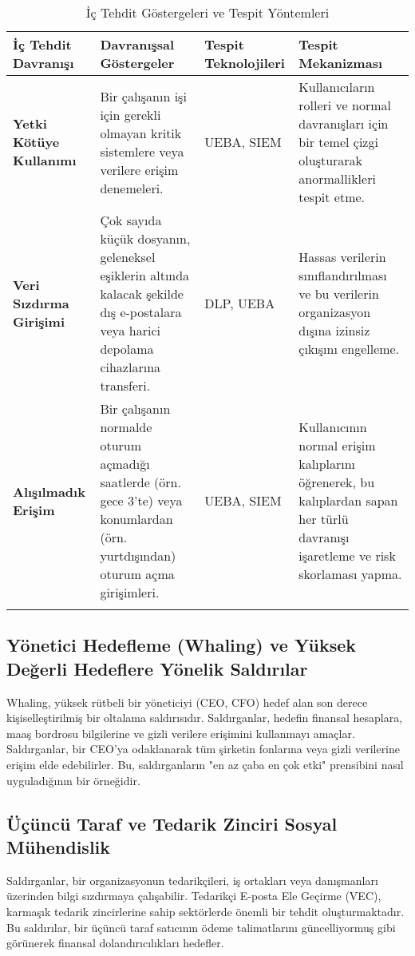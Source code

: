 \begin{longtable}{|p{4cm}|p{4cm}|p{4cm}|p{4cm}|}
    \hline
    \textbf{İç Tehdit Davranışı} & \textbf{Davranışsal Göstergeler} & \textbf{Tespit Teknolojileri} & \textbf{Tespit Mekanizması} \\
    \hline
    \endhead
    \textbf{Yetki Kötüye Kullanımı} & Bir çalışanın işi için gerekli olmayan kritik sistemlere veya verilere erişim denemeleri. & UEBA, SIEM & Kullanıcıların rolleri ve normal davranışları için bir temel çizgi oluşturarak anormallikleri tespit etme. \\
    \hline
    \textbf{Veri Sızdırma Girişimi} & Çok sayıda küçük dosyanın, geleneksel eşiklerin altında kalacak şekilde dış e-postalara veya harici depolama cihazlarına transferi. & DLP, UEBA & Hassas verilerin sınıflandırılması ve bu verilerin organizasyon dışına izinsiz çıkışını engelleme. \\
    \hline
    \textbf{Alışılmadık Erişim} & Bir çalışanın normalde oturum açmadığı saatlerde (örn. gece 3'te) veya konumlardan (örn. yurtdışından) oturum açma girişimleri. & UEBA, SIEM & Kullanıcının normal erişim kalıplarını öğrenerek, bu kalıplardan sapan her türlü davranışı işaretleme ve risk skorlaması yapma. \\
    \hline
\caption{İç Tehdit Göstergeleri ve Tespit Yöntemleri}
\end{longtable}

\subsection{Yönetici Hedefleme (Whaling) ve Yüksek Değerli Hedeflere Yönelik Saldırılar}

Whaling, yüksek rütbeli bir yöneticiyi (CEO, CFO) hedef alan son derece kişiselleştirilmiş bir oltalama saldırısıdır. Saldırganlar, hedefin finansal hesaplara, maaş bordrosu bilgilerine ve gizli verilere erişimini kullanmayı amaçlar. Saldırganlar, bir CEO'ya odaklanarak tüm şirketin fonlarına veya gizli verilerine erişim elde edebilirler. Bu, saldırganların "en az çaba en çok etki" prensibini nasıl uyguladığının bir örneğidir.

\subsection{Üçüncü Taraf ve Tedarik Zinciri Sosyal Mühendislik}

Saldırganlar, bir organizasyonun tedarikçileri, iş ortakları veya danışmanları üzerinden bilgi sızdırmaya çalışabilir. Tedarikçi E-posta Ele Geçirme (VEC), karmaşık tedarik zincirlerine sahip sektörlerde önemli bir tehdit oluşturmaktadır. Bu saldırılar, bir üçüncü taraf satıcının ödeme talimatlarını güncelliyormuş gibi görünerek finansal dolandırıcılıkları hedefler.

